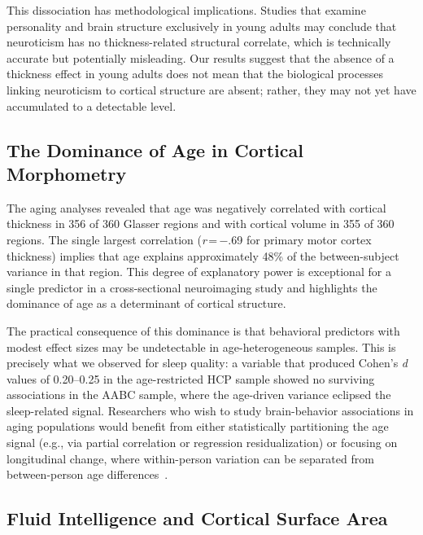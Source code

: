 This dissociation has methodological implications.
Studies that examine personality and brain structure exclusively in young adults may conclude that neuroticism has no thickness-related structural correlate, which is technically accurate but potentially misleading.
Our results suggest that the absence of a thickness effect in young adults does not mean that the biological processes linking neuroticism to cortical structure are absent; rather, they may not yet have accumulated to a detectable level.

\subsection{The Dominance of Age in Cortical Morphometry}

The aging analyses revealed that age was negatively correlated with cortical thickness in 356 of 360 Glasser regions and with cortical volume in 355 of 360 regions.
The single largest correlation (\textit{r}\,=\,$-$.69 for primary motor cortex thickness) implies that age explains approximately 48\% of the between-subject variance in that region.
This degree of explanatory power is exceptional for a single predictor in a cross-sectional neuroimaging study and highlights the dominance of age as a determinant of cortical structure.

The practical consequence of this dominance is that behavioral predictors with modest effect sizes may be undetectable in age-heterogeneous samples.
This is precisely what we observed for sleep quality: a variable that produced Cohen's \textit{d} values of 0.20--0.25 in the age-restricted HCP sample showed no surviving associations in the AABC sample, where the age-driven variance eclipsed the sleep-related signal.
Researchers who wish to study brain-behavior associations in aging populations would benefit from either statistically partitioning the age signal (e.g., via partial correlation or regression residualization) or focusing on longitudinal change, where within-person variation can be separated from between-person age differences~\cite{fjell2023poor, storsve2014differential}.

\subsection{Fluid Intelligence and Cortical Surface Area}


